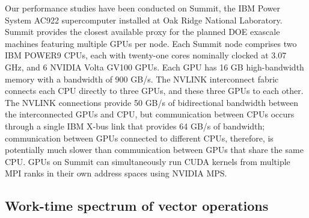 \documentclass[10pt,journal,compsoc]{IEEEtran}
\begin{document}


Our performance studies have been conducted on Summit, the IBM Power
System AC922 supercomputer installed at Oak Ridge National Laboratory. 
Summit provides the closest available proxy for the planned %
DOE exascale machines featuring multiple GPUs per node. Each
Summit node comprises two IBM POWER9 CPUs, each with twenty-one cores
nominally clocked at 3.07 GHz, and 6 NVIDIA Volta GV100 GPUs. Each GPU has 
16 GB high-bandwidth memory with a bandwidth of 900 GB/s.
The NVLINK
interconnect fabric connects each CPU directly to three GPUs, and these
three GPUs to each other. The NVLINK connections provide 50 GB/s of
bidirectional bandwidth between the interconnected GPUs and CPU, but
communication between CPUs occurs through a single IBM X-bus link that provides
64 GB/s of bandwidth; communication between GPUs connected to different CPUs,
therefore, is potentially much slower than communication between GPUs that share
the same CPU. GPUs on Summit can simultaneously run CUDA kernels from multiple MPI ranks
in their own address spaces using NVIDIA MPS. %

\subsection{Work-time spectrum of vector operations}
\label{sec:basic_vector_ops}
\end{document}
